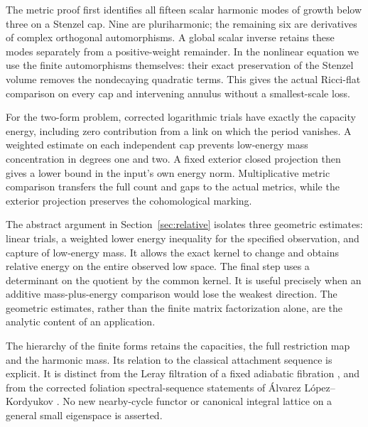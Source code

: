 The metric proof first identifies all fifteen scalar harmonic modes
of growth below three on a Stenzel cap. Nine are pluriharmonic; the
remaining six are derivatives of complex orthogonal automorphisms.
A global scalar inverse retains these modes separately from a
positive-weight remainder. In the nonlinear equation we use the
finite automorphisms themselves: their exact preservation of the
Stenzel volume removes the nondecaying quadratic terms. This gives
the actual Ricci-flat comparison on every cap and intervening annulus
without a smallest-scale loss.

For the two-form problem, corrected logarithmic trials have exactly
the capacity energy, including zero contribution from a link on
which the period vanishes. A weighted estimate on each independent
cap prevents low-energy mass concentration in degrees one and two.
A fixed exterior closed projection then gives a lower bound in the
input's own energy norm. Multiplicative metric comparison transfers
the full count and gaps to the actual metrics, while the exterior
projection preserves the cohomological marking.

The abstract argument in Section~\ref{sec:relative} isolates three
geometric estimates: linear trials, a weighted lower energy inequality
for the specified observation, and capture of low-energy mass. It
allows the exact kernel to change and obtains relative energy on the
entire observed low space. The final step uses a determinant on the
quotient by the common kernel. It is useful precisely when an additive
mass-plus-energy comparison would lose the weakest direction. The
geometric estimates, rather than the finite matrix factorization alone,
are the analytic content of an application.

The hierarchy of the finite forms retains the capacities, the full
restriction map and the harmonic mass. Its relation to the classical
attachment sequence is explicit. It is distinct from the Leray
filtration of a fixed adiabatic fibration
\cite{mazzeo-melrose}, and from the corrected foliation spectral-sequence
statements of Álvarez López--Kordyukov \cite{alvarez-kordyukov}.
No new nearby-cycle functor or canonical integral lattice on a general
small eigenspace is asserted.
